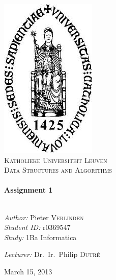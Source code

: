 \begin{titlepage}
\begin{center}
\includegraphics[scale=0.25]{logo.jpg} \\
\textsc{\large Katholieke Universiteit Leuven}\\[4cm]
\textsc{\LARGE Data Structures and Algorithms}\\[0.5cm]

\HRule \\[0.4cm]
{ \huge \bfseries Assignment 1}\\[0.4cm]

\HRule \\[1.5cm]

\begin{minipage}{0.45\textwidth}
\begin{flushleft} \large
\emph{Author:}
Pieter \textsc{Verlinden}\\

\emph{Student ID:}
r0369547\\

\emph{Study:}
1Ba Informatica

\end{flushleft}

\end{minipage}
\hfill
\begin{minipage}{0.45\textwidth}
\begin{flushleft} \large
\emph{Lecturer:} 
Dr.~Ir.~Philip \textsc{Dutré}
\end{flushleft}
\end{minipage}

\vfill

{\large March 15, 2013}

\end{center}
\end{titlepage}